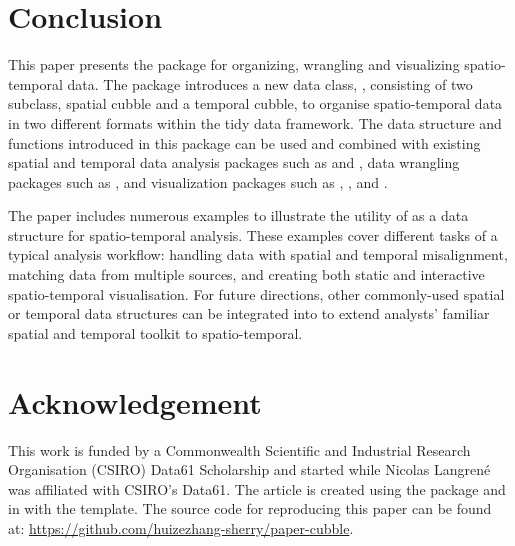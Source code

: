\documentclass[
  shortnames]{jss}
\begin{document}
\hypertarget{conclude}{%
\section{Conclusion}\label{conclude}}

This paper presents the  package  for organizing, wrangling and visualizing spatio-temporal data. The package introduces a new data class, , consisting of two subclass, spatial cubble and a temporal cubble, to organise spatio-temporal data in two different formats within the tidy data framework. The data structure and functions introduced in this package can be used and combined with existing spatial and temporal data analysis packages such as  and , data wrangling packages such as , and visualization packages such as , , and .

The paper includes numerous examples to illustrate the utility of  as a data structure for spatio-temporal analysis. These examples cover different tasks of a typical analysis workflow: handling data with spatial and temporal misalignment, matching data from multiple sources, and creating both static and interactive spatio-temporal visualisation. For future directions, other commonly-used spatial or temporal data structures can be integrated into  to extend analysts' familiar spatial and temporal toolkit to spatio-temporal.

\hypertarget{acknowledgement}{%
\section{Acknowledgement}\label{acknowledgement}}

This work is funded by a Commonwealth Scientific and Industrial Research Organisation (CSIRO) Data61 Scholarship and started while Nicolas Langrené was affiliated with CSIRO's Data61. The article is created using the package  \citep{knitr} and  \citep{rmarkdown} in  with the  template. The source code for reproducing this paper can be found at: \url{https://github.com/huizezhang-sherry/paper-cubble}.


\end{document}
